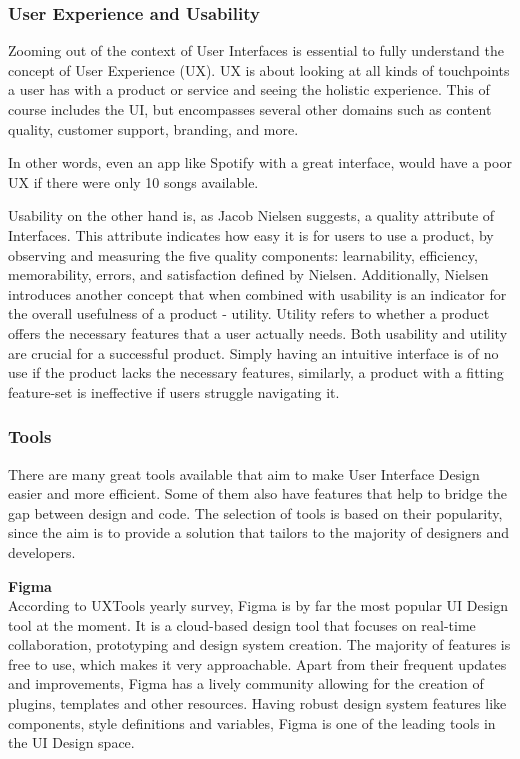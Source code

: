\subsubsection{User Experience and Usability}
Zooming out of the context of User Interfaces is essential to fully understand the concept of User
Experience (UX). UX is about looking at all kinds of touchpoints a user has with a product or
service and seeing the holistic experience. This of course includes the UI, but encompasses several
other domains such as content quality, customer support, branding, and more.

In other words, even an app like Spotify with a great interface, would have a poor UX if there were
only 10 songs available.

Usability on the other hand is, as Jacob Nielsen suggests, a quality attribute of Interfaces. This
attribute indicates how easy it is for users to use a product, by observing and measuring the five
quality components: learnability, efficiency, memorability, errors, and satisfaction
defined by Nielsen. Additionally, Nielsen introduces another concept that when combined with
usability is an indicator for the overall usefulness of a product - utility. Utility refers to
whether a product offers the necessary features that a user actually needs. Both usability and
utility are crucial for a successful product. Simply having an intuitive interface is of no use if
the product lacks the necessary features, similarly, a product with a fitting feature-set is
ineffective if users struggle navigating it.

\subsubsection{Tools}
There are many great tools available that aim to make User Interface Design easier and more
efficient. Some of them also have features that help to bridge the gap between design and code. The
selection of tools is based on their popularity, since the aim is to provide a solution that
tailors to the majority of designers and developers. %

\textbf{Figma}\\
According to UXTools yearly survey, Figma is by far the most popular UI Design tool at the moment.
 It is a cloud-based design tool that focuses on real-time
collaboration, prototyping and design system creation. The majority of features is free to use,
which makes it very approachable. Apart from their frequent updates and improvements, Figma has a
lively community allowing for the creation of plugins, templates and other resources. Having robust
design system features like components, style definitions and variables, Figma is one of the leading
tools in the UI Design space. 

